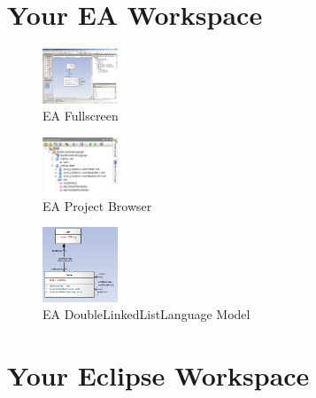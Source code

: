 \newpage

\section{Your EA Workspace}
\begin{figure}[!h]
	\centering
  \includegraphics[width=0.2\textwidth]{pics/ea_fullscreen.png}
	\caption{EA Fullscreen}
	\label{fig_eafullscreen}
\end{figure}

\begin{figure}[!h]
	\centering
  \includegraphics[width=0.2\textwidth]{pics/ea_projecttree.png}
	\caption{EA Project Browser}
	\label{fig_eaProjecttree}
\end{figure}

\begin{figure}[!h]
	\centering
  \includegraphics[width=0.2\textwidth]{pics/ea_modelDoubleLinkedListLanguage.png}
	\caption{EA DoubleLinkedListLanguage Model}
	\label{fig_eamodelDoubleLinkedListLanguage}
\end{figure}


\section{Your Eclipse Workspace}
